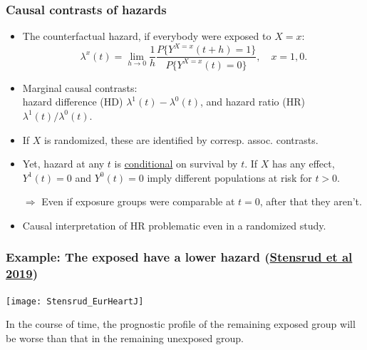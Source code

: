 \documentclass[12pt,dvipsnames,t,aspectratio=169, handout%
]{beamer}
\begin{document}
\begin{frame}
\frametitle{\large Causal contrasts of hazards}

\begin{itemize}
\item
The counterfactual hazard, if everybody were exposed to $X=x$:
$$ \lambda^x(t) %
                = \lim_{h \to 0} \frac{1}{h} \frac{P\{ Y^{X=x}(t + h)=1 \}} {P\{ Y^{X=x}(t) = 0 \}}, \quad x = 1,0. $$
\item
Marginal causal contrasts: \\ hazard difference (HD) $\lambda^1(t) - \lambda^0(t)$,
and hazard ratio (HR) ${\lambda^1(t)}/{ \lambda^0(t) }$.
\medskip
\item
If $X$ is randomized, these are identified by corresp. assoc. contrasts. 
\medskip					
\item  
Yet, hazard at any $t$ is \underline{conditional} on survival by $t$. 
If $X$ has any effect, 
 $Y^{1}(t) =0$ and $Y^{0}(t) =0$ imply
different populations at risk for $t>0$. 
\medskip
\item[$\Rightarrow$] Even if exposure groups were comparable at $t=0$,  after that they aren't.
\medskip
\item Causal interpretation of HR problematic even in a randomized study.  
\end{itemize}
\end{frame}

\begin{frame}
\frametitle{Example: The exposed have a lower hazard 
     {\small (\href{https://doi.org/10.1093/eurheartj/ehy770}{Stensrud et al 2019})} }
\begin{center}		
\texttt{[image: Stensrud\_EurHeartJ]}
\end{center}
\bi
\item
In the course of time, the prognostic profile of the remaining exposed group will be worse
than that in the remaining unexposed group.
\ei
\end{frame}
\end{document}
